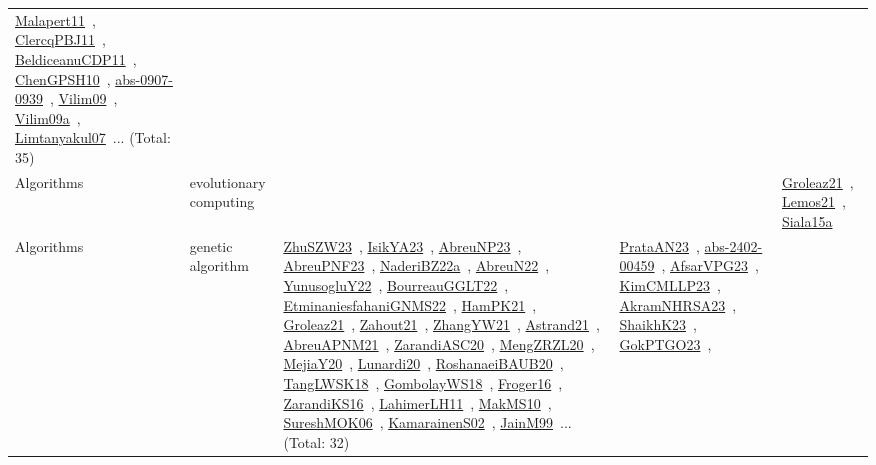 {\begin{longtable}{lp{3cm}>{\raggedright\arraybackslash}p{6cm}>{\raggedright\arraybackslash}p{6cm}>{\raggedright\arraybackslash}p{8cm}}
\href{../works/Malapert11.pdf}{Malapert11}~\cite{Malapert11}, \href{../works/ClercqPBJ11.pdf}{ClercqPBJ11}~\cite{ClercqPBJ11}, \href{../works/BeldiceanuCDP11.pdf}{BeldiceanuCDP11}~\cite{BeldiceanuCDP11}, \href{../works/ChenGPSH10.pdf}{ChenGPSH10}~\cite{ChenGPSH10}, \href{../works/abs-0907-0939.pdf}{abs-0907-0939}~\cite{abs-0907-0939}, \href{../works/Vilim09.pdf}{Vilim09}~\cite{Vilim09}, \href{../works/Vilim09a.pdf}{Vilim09a}~\cite{Vilim09a}, \href{../works/Limtanyakul07.pdf}{Limtanyakul07}~\cite{Limtanyakul07}... (Total: 35)\\
Algorithms & evolutionary computing &  &  & \href{../works/Groleaz21.pdf}{Groleaz21}~\cite{Groleaz21}, \href{../works/Lemos21.pdf}{Lemos21}~\cite{Lemos21}, \href{../works/Siala15a.pdf}{Siala15a}~\cite{Siala15a}\\
Algorithms & genetic algorithm & \href{../works/ZhuSZW23.pdf}{ZhuSZW23}~\cite{ZhuSZW23}, \href{../works/IsikYA23.pdf}{IsikYA23}~\cite{IsikYA23}, \href{../works/AbreuNP23.pdf}{AbreuNP23}~\cite{AbreuNP23}, \href{../works/AbreuPNF23.pdf}{AbreuPNF23}~\cite{AbreuPNF23}, \href{../works/NaderiBZ22a.pdf}{NaderiBZ22a}~\cite{NaderiBZ22a}, \href{../works/AbreuN22.pdf}{AbreuN22}~\cite{AbreuN22}, \href{../works/YunusogluY22.pdf}{YunusogluY22}~\cite{YunusogluY22}, \href{../works/BourreauGGLT22.pdf}{BourreauGGLT22}~\cite{BourreauGGLT22}, \href{../works/EtminaniesfahaniGNMS22.pdf}{EtminaniesfahaniGNMS22}~\cite{EtminaniesfahaniGNMS22}, \href{../works/HamPK21.pdf}{HamPK21}~\cite{HamPK21}, \href{../works/Groleaz21.pdf}{Groleaz21}~\cite{Groleaz21}, \href{../works/Zahout21.pdf}{Zahout21}~\cite{Zahout21}, \href{../works/ZhangYW21.pdf}{ZhangYW21}~\cite{ZhangYW21}, \href{../works/Astrand21.pdf}{Astrand21}~\cite{Astrand21}, \href{../works/AbreuAPNM21.pdf}{AbreuAPNM21}~\cite{AbreuAPNM21}, \href{../works/ZarandiASC20.pdf}{ZarandiASC20}~\cite{ZarandiASC20}, \href{../works/MengZRZL20.pdf}{MengZRZL20}~\cite{MengZRZL20}, \href{../works/MejiaY20.pdf}{MejiaY20}~\cite{MejiaY20}, \href{../works/Lunardi20.pdf}{Lunardi20}~\cite{Lunardi20}, \href{../works/RoshanaeiBAUB20.pdf}{RoshanaeiBAUB20}~\cite{RoshanaeiBAUB20}, \href{../works/TangLWSK18.pdf}{TangLWSK18}~\cite{TangLWSK18}, \href{../works/GombolayWS18.pdf}{GombolayWS18}~\cite{GombolayWS18}, \href{../works/Froger16.pdf}{Froger16}~\cite{Froger16}, \href{../works/ZarandiKS16.pdf}{ZarandiKS16}~\cite{ZarandiKS16}, \href{../works/LahimerLH11.pdf}{LahimerLH11}~\cite{LahimerLH11}, \href{../works/MakMS10.pdf}{MakMS10}~\cite{MakMS10}, \href{../works/SureshMOK06.pdf}{SureshMOK06}~\cite{SureshMOK06}, \href{../works/KamarainenS02.pdf}{KamarainenS02}~\cite{KamarainenS02}, \href{../works/JainM99.pdf}{JainM99}~\cite{JainM99}... (Total: 32) & \href{../works/PrataAN23.pdf}{PrataAN23}~\cite{PrataAN23}, \href{../works/abs-2402-00459.pdf}{abs-2402-00459}~\cite{abs-2402-00459}, \href{../works/AfsarVPG23.pdf}{AfsarVPG23}~\cite{AfsarVPG23}, \href{../works/KimCMLLP23.pdf}{KimCMLLP23}~\cite{KimCMLLP23}, \href{../works/AkramNHRSA23.pdf}{AkramNHRSA23}~\cite{AkramNHRSA23}, \href{../works/ShaikhK23.pdf}{ShaikhK23}~\cite{ShaikhK23}, \href{../works/GokPTGO23.pdf}{GokPTGO23}~\cite{GokPTGO23}, 
\end{longtable}}

